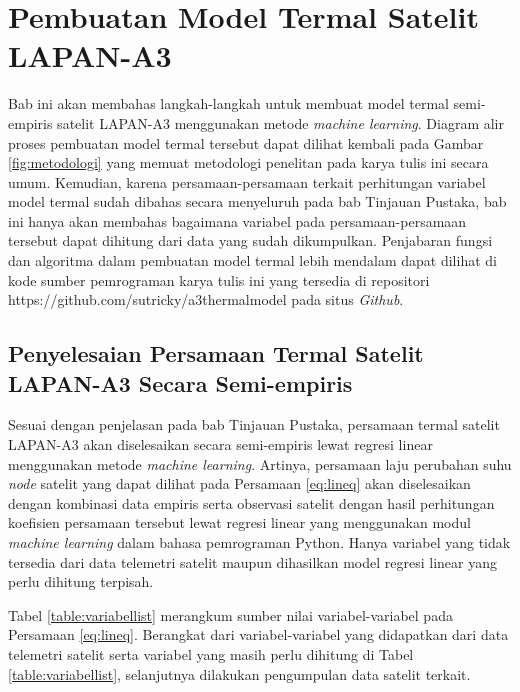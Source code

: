 \chapter{Pembuatan Model Termal Satelit LAPAN-A3}

Bab ini akan membahas langkah-langkah untuk membuat model termal semi-empiris
satelit LAPAN-A3 menggunakan metode \textit{machine learning}. Diagram alir
proses pembuatan model termal tersebut dapat dilihat kembali pada Gambar
\ref{fig:metodologi} yang memuat metodologi penelitan pada karya tulis ini
secara umum. Kemudian, karena persamaan-persamaan terkait perhitungan variabel
model termal sudah dibahas secara menyeluruh pada bab Tinjauan Pustaka, bab ini
hanya akan membahas bagaimana variabel pada persamaan-persamaan tersebut dapat
dihitung dari data yang sudah dikumpulkan. Penjabaran fungsi dan algoritma
dalam pembuatan model termal lebih mendalam dapat dilihat di kode sumber
pemrograman karya tulis ini yang tersedia di repositori
https://github.com/sutricky/a3thermalmodel pada situs \textit{Github}.

\section{Penyelesaian Persamaan Termal Satelit LAPAN-A3 Secara Semi-empiris}

Sesuai dengan penjelasan pada bab Tinjauan Pustaka, persamaan termal satelit
LAPAN-A3 akan diselesaikan secara semi-empiris lewat regresi linear menggunakan
metode \textit{machine learning}. Artinya, persamaan laju perubahan suhu
\textit{node} satelit yang dapat dilihat pada Persamaan \ref{eq:lineq} akan
diselesaikan dengan kombinasi data empiris serta observasi satelit dengan hasil
perhitungan koefisien persamaan tersebut lewat regresi linear yang menggunakan
modul \textit{machine learning} dalam bahasa pemrograman Python. Hanya variabel
yang tidak tersedia dari data telemetri satelit maupun dihasilkan model regresi
linear yang perlu dihitung terpisah. 

Tabel \ref{table:variabellist} merangkum sumber nilai variabel-variabel pada
Persamaan \ref{eq:lineq}. Berangkat dari variabel-variabel yang didapatkan dari
data telemetri satelit serta variabel yang masih perlu dihitung di Tabel
\ref{table:variabellist}, selanjutnya dilakukan pengumpulan data satelit terkait.

